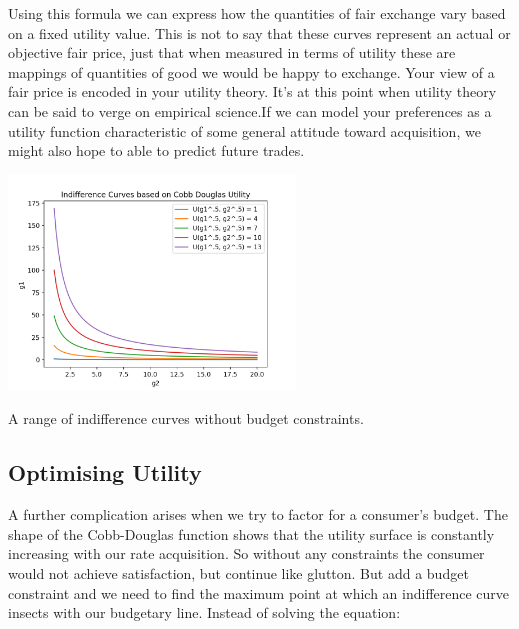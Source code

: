 \documentclass{tufte-handout}
\begin{document}
Using this formula we can express how the quantities of fair exchange vary based on a fixed utility value. This is not to say that these curves represent an actual or objective fair price, just that when measured in terms of utility these are mappings of quantities of good we would be happy to exchange. Your view of a fair price is encoded in your utility theory. It's at this point when utility theory can be said to verge on empirical science.If we can model your preferences as a utility function characteristic of some general attitude toward acquisition, we might also hope to able to predict future trades.  
\begin{marginfigure}
\includegraphics[width=3in, height=5.in]{Plots/indifference_curves.png}
\caption{A range of indifference curves without budget constraints.}
\end{marginfigure}

\subsection*{Optimising Utility}
A further complication arises when  we try to factor for a consumer's budget. The shape of the Cobb-Douglas function shows that the utility surface is constantly increasing with our rate acquisition. So without any constraints the consumer would not achieve satisfaction, but continue like glutton. But add a budget constraint and we need to find the maximum point at which an indifference curve insects with our budgetary line. Instead of solving the equation: 
\end{document}
